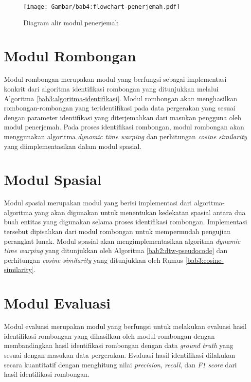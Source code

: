 \begin{figure}[t]
    \centering
    \texttt{[image: Gambar/bab4:flowchart-penerjemah.pdf]}
    \caption{Diagram alir modul penerjemah}
    \label{bab4:flowchart-penerjemah}
\end{figure}

\section{Modul Rombongan}
\label{sec:des-rombongan}

Modul rombongan merupakan modul yang berfungsi sebagai implementasi konkrit dari algoritma identifikasi rombongan yang ditunjukkan melalui Algoritma \ref{bab3:algoritma-identifikasi}. Modul rombongan akan menghasilkan rombongan-rombongan yang teridentifikasi pada data pergerakan yang sesuai dengan parameter identifikasi yang diterjemahkan dari masukan pengguna oleh modul penerjemah. Pada proses identifikasi rombongan, modul rombongan akan menggunakan algoritma \textit{dynamic time warping} dan perhitungan \textit{cosine similarity} yang diimplementasikan dalam modul spasial.

\section{Modul Spasial}
\label{sec:des-spatial}

Modul spasial merupakan modul yang berisi implementasi dari algoritma-algoritma yang akan digunakan untuk menentukan kedekatan spasial antara dua buah entitas yang digunakan selama proses identifikasi rombongan. Implementasi tersebut dipisahkan dari modul rombongan untuk mempermudah pengujian perangkat lunak. Modul spasial akan mengimplementasikan algoritma \textit{dynamic time warping} yang ditunjukkan oleh Algoritma \ref{bab2:dtw-pseudocode} dan perhitungan \textit{cosine similarity} yang ditunjukkan oleh Rumus \ref{bab3:cosine-similarity}.

\section{Modul Evaluasi}
\label{sec:des-evaluation}

Modul evaluasi merupakan modul yang berfungsi untuk melakukan evaluasi hasil identifikasi rombongan yang dihasilkan oleh modul rombongan dengan membandingkan hasil identifikasi rombongan dengan data \textit{ground truth} yang sesuai dengan masukan data pergerakan. Evaluasi hasil identifikasi dilakukan secara kuantitatif dengan menghitung nilai \textit{precision}, \textit{recall}, dan \textit{F1 score} dari hasil identifikasi rombongan.

